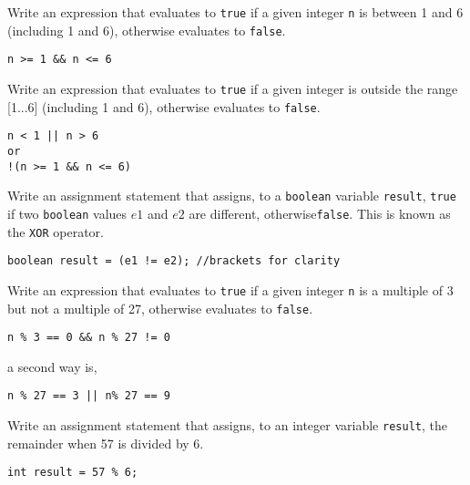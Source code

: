 \begin{questions}
\question Write an expression that evaluates to \texttt{true} if a given integer \texttt{n} is between 1 and 6 (including 1 and 6), otherwise evaluates to \texttt{false}.

\begin{solution}
\begin{verbatim}
n >= 1 && n <= 6 
\end{verbatim}
\end{solution}

\question Write an expression that evaluates to \texttt{true} if a given integer is outside the range [1...6] (including 1 and 6), otherwise evaluates to \texttt{false}.

\begin{solution}
\begin{verbatim}
n < 1 || n > 6
or
!(n >= 1 && n <= 6)
\end{verbatim}
\end{solution}


\question Write an assignment statement that assigns, to a \texttt{boolean} variable \texttt{result}, \texttt{true} if two \texttt{boolean} values $e1$ and $e2$ are different, otherwise\texttt{false}. This is known as the \texttt{XOR} operator.

\begin{solution}
\begin{lstlisting}
boolean result = (e1 != e2); //brackets for clarity	
\end{lstlisting}
\end{solution}

\question Write an expression that evaluates to \texttt{true} if a given integer \texttt{n} is a multiple of 3 but not a multiple of 27, otherwise evaluates to \texttt{false}.

\begin{solution}
\begin{lstlisting}	
n % 3 == 0 && n % 27 != 0
\end{lstlisting}
a second way is,
\begin{lstlisting}	
n % 27 == 3 || n% 27 == 9
\end{lstlisting}
\end{solution}

\question Write an assignment statement that assigns, to an integer variable \texttt{result}, the remainder when 57 is divided by 6.

\begin{solution}
\begin{lstlisting}	
int result = 57 % 6;
\end{lstlisting}
\end{solution}


\end{questions}
